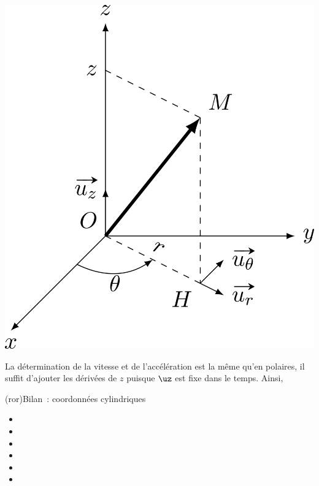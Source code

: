\documentclass[../../main/main.tex]{subfiles}
\begin{document}
\begin{tcb*}[sidebyside, righthand ratio=.25]
\begin{center}
{			\includegraphics[width=\linewidth]{cyl_rep}
		}
		\vspace{-15pt}
		\captionsetup{justification=centering}
	\end{center}
\end{tcb*}

La détermination de la vitesse et de l'accélération est la même qu'en polaires,
il suffit d'ajouter les dérivées de $z$ puisque $\uz$ est fixe dans le temps.
Ainsi,

\begin{tcb*}(ror){Bilan~: coordonnées cylindriques}
	\begin{itemize}[itemsep=-10pt]
		\item {}
		      {}
		\item {}
		      {\psw{$(\ur,\ut,\uz)$}}
		\item {}
		      {}
		\item {}
		      {}
		\item {}
		      {}
		\item {}
		      {}
	\end{itemize}
\end{tcb*}
\end{document}
